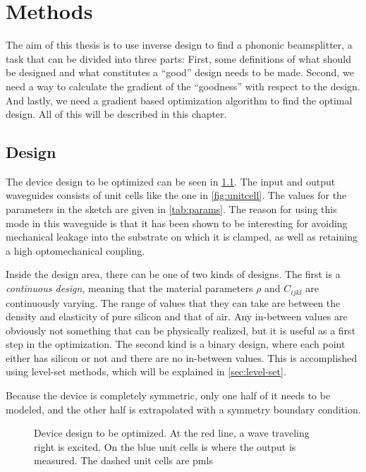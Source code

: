 \chapter{Methods}

The aim of this thesis is to use inverse design to find a phononic beamsplitter,
a task that can be divided into three parts: 
First, some definitions of what
should be designed and what constitutes a ``good'' design needs to be made.
Second, we need a way to calculate the gradient of the ``goodness'' with respect
to the design.
And lastly, we need a gradient based optimization algorithm to find the optimal
design.
All of this will be described in this chapter.

\section{Design}

The device design to be optimized can be seen in \cref{fig:bs-design}.
The input and output waveguides consists of unit cells like the one in
\cref{fig:unitcell}.
The values for the parameters in the sketch are given in \cref{tab:params}.
The reason for using this mode in this waveguide is that it has been shown to be
interesting for avoiding mechanical leakage into the substrate on which it is
clamped, as well as retaining a high optomechanical
coupling.\cite{kolvik_clamped_2023}

Inside the design area, there can be one of two kinds of designs.
The first is a \emph{continuous design}, meaning that the material parameters
$\rho$ and $C_{ijkl}$ are continuously varying. The range of values that they
can take are between the density and elasticity of pure silicon and that of air.
Any in-between values are obviously not something that can be physically
realized, but it is useful as a first step in the optimization.
The second kind is a binary design, where each point either has silicon or not
and there are no in-between values.
This is accomplished using level-set methods, which will be explained in
\cref{sec:level-set}.

Because the device is completely symmetric, only one half of it needs to be
modeled, and the other half is extrapolated with a symmetry boundary condition.

\begin{figure}[htpb]
	\centering
	
	\caption{
		Device design to be optimized.
		At the red line, a wave traveling right is excited.
		On the blue unit cells is where the output is measured.
		The dashed unit cells are \glspl{pml}
	}
	\label{fig:bs-design}
\end{figure}

